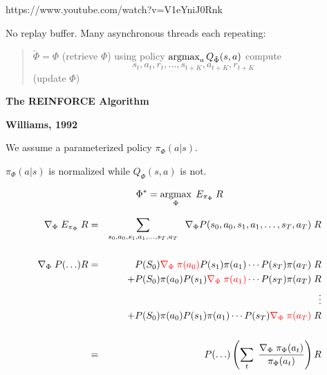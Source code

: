 {

https://www.youtube.com/watch?v=V1eYniJ0Rnk

No replay buffer.
Many asynchronous threads each repeating:
\vfill

  \begin{quotation}
  \noindent $\tilde{\Phi} = \Phi$ (retrieve $\Phi$)\newline \newline
  \noindent using policy $\operatorname*{argmax}_a Q_{\tilde{\Phi}}(s,a)$ compute $$s_t,a_t,r_t,\ldots,s_{t+K},a_{t+K},r_{t+K}$$
  \newline
   (update $\Phi$)
  \end{quotation}

\slide{}
\centerline{\bf The REINFORCE Algorithm}

\vfill
\centerline{\bf Williams, 1992}
\vfill\vfill


We assume a parameterized policy $\pi_\Phi(a|s)$.

\vfill
$\pi_\Phi(a|s)$ is normalized while $Q_\Phi(s,a)$ is not.


$$\Phi^* = \operatorname*{argmax}_\Phi\; E_{\pi_\Phi} \; R$$

{\huge
\begin{eqnarray*}
  \nabla_\Phi \;E_{\pi_\Phi}\;R & = & \sum_{s_0,a_0,s_1,a_1,\ldots,s_T,a_T}\;\;\nabla_\Phi P(s_0,a_0,s_1,a_1,\ldots,s_T,a_T)\;R \\
  \\
  \nabla_\Phi \;P(\ldots)R & = & P(S_0){\color{red} \nabla_\Phi \;\pi(a_0)}P(s_1)\pi(a_1) \cdots P(s_T)\pi(a_T)\;R \\
  & & + P(S_0)\pi(a_0)P(s_1){\color{red} \nabla_\Phi\;\pi(a_1)} \cdots P(s_T)\pi(a_T)\;R \\
  & & \vdots \\
  & & + P(S_0)\pi(a_0)P(s_1)\pi(a_1) \cdots P(s_T){\color{red} \nabla_\Phi\;\pi(a_T)}\;R \\
  \\
  & = & P(\ldots) \left(\sum_t\;\frac{\nabla_\Phi\;\pi_\Phi(a_t)}{\pi_\Phi(a_t)}\right) R
\end{eqnarray*}
}


}
